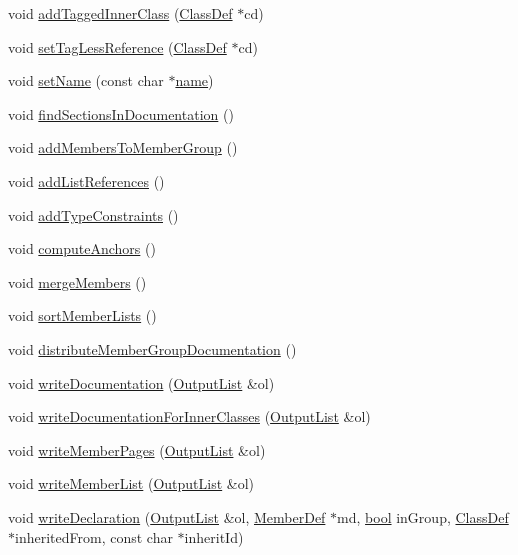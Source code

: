 \begin{DoxyCompactItemize}
\item 
void \hyperlink{class_class_def_af296a31d3370a31f045c15b2c2416e45}{add\+Tagged\+Inner\+Class} (\hyperlink{class_class_def}{Class\+Def} $\ast$cd)
\item 
void \hyperlink{class_class_def_ad5dd11704dacb9bf4da36895353c75e1}{set\+Tag\+Less\+Reference} (\hyperlink{class_class_def}{Class\+Def} $\ast$cd)
\item 
void \hyperlink{class_class_def_a3e64e04797c5b3e0c8d3f83ed9f606df}{set\+Name} (const char $\ast$\hyperlink{class_definition_a99481361779e85f0c1556709de7d9e5b}{name})
\item 
void \hyperlink{class_class_def_aa630f678cdb809f3dc2c1627d8dd8ada}{find\+Sections\+In\+Documentation} ()
\item 
void \hyperlink{class_class_def_a3ff19aa536bf2b62c34b9bca172c902d}{add\+Members\+To\+Member\+Group} ()
\item 
void \hyperlink{class_class_def_a328c9eb09f3ebe71fc2f438d54449487}{add\+List\+References} ()
\item 
void \hyperlink{class_class_def_a2e1a29b3efab736f2e90c44232462568}{add\+Type\+Constraints} ()
\item 
void \hyperlink{class_class_def_a2234bc6e693f594996d346ead69b82d0}{compute\+Anchors} ()
\item 
void \hyperlink{class_class_def_a91edf0e1d111bb5b90561af28ec93409}{merge\+Members} ()
\item 
void \hyperlink{class_class_def_a4648d08c5b9aad04f16dec694ae633bc}{sort\+Member\+Lists} ()
\item 
void \hyperlink{class_class_def_aaa19050a06de4d2159d19c7b586e6cd2}{distribute\+Member\+Group\+Documentation} ()
\item 
void \hyperlink{class_class_def_abdd9efb495d4f901b22d1fed1b26d210}{write\+Documentation} (\hyperlink{class_output_list}{Output\+List} \&ol)
\item 
void \hyperlink{class_class_def_a2d02ed5a834d3e56c67d57b7fe8ea669}{write\+Documentation\+For\+Inner\+Classes} (\hyperlink{class_output_list}{Output\+List} \&ol)
\item 
void \hyperlink{class_class_def_ac8f891bbbe8c8319ba381e75f86e2633}{write\+Member\+Pages} (\hyperlink{class_output_list}{Output\+List} \&ol)
\item 
void \hyperlink{class_class_def_a819888b69265792ce9d47e4a6a045695}{write\+Member\+List} (\hyperlink{class_output_list}{Output\+List} \&ol)
\item 
void \hyperlink{class_class_def_ab9701f34d56e4dfee3e4ccd2fd6a6f5b}{write\+Declaration} (\hyperlink{class_output_list}{Output\+List} \&ol, \hyperlink{class_member_def}{Member\+Def} $\ast$md, \hyperlink{qglobal_8h_a1062901a7428fdd9c7f180f5e01ea056}{bool} in\+Group, \hyperlink{class_class_def}{Class\+Def} $\ast$inherited\+From, const char $\ast$inherit\+Id)

\end{DoxyCompactItemize}
